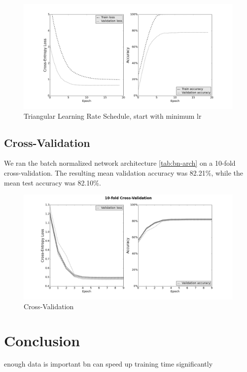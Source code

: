 \documentclass[a4paper, 11pt]{article}
\begin{document}
\begin{figure}[H]
	\includegraphics[width=\linewidth]{triangular-min-to-max.png}
	\caption{Triangular Learning Rate Schedule, start with minimum lr }
	\label{fig:triangular-min-to-max}
\end{figure}

\clearpage

\subsection{Cross-Validation}

We ran the batch normalized network architecture \cref{tab:bn-arch} on a 10-fold cross-validation.
The resulting mean validation accuracy was 82.21\%, while the mean test accuracy was 82.10\%.

\begin{figure}[H]
	\includegraphics[width=\linewidth]{cross-val.png}
	\caption{Cross-Validation}
	\label{fig:cross-val}
\end{figure}


\section{Conclusion}
enough data is important
bn can speed up training time significantly


\clearpage

\end{document}
